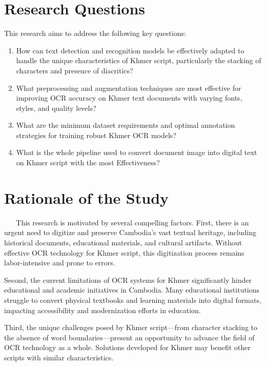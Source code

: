 \section{Research Questions}
\label{sec:questions}

This research aims to address the following key questions:

\begin{enumerate}
    \item How can text detection and recognition models be effectively adapted to handle the unique characteristics of Khmer script, particularly the stacking of characters and presence of diacritics?
    
    \item What preprocessing and augmentation techniques are most effective for improving OCR accuracy on Khmer text documents with varying fonts, styles, and quality levels?

    \item What are the minimum dataset requirements and optimal annotation strategies for training robust Khmer OCR models?
    
    \item What is the whole pipeline used to convert document image into digital text on Khmer script with the most Effectiveness?
\end{enumerate}

\section{Rationale of the Study}
\label{sec:rationale}
​​​​​  ​ ​ ​  ​ This research is motivated by several compelling factors. First, there is an urgent need to digitize and preserve Cambodia's vast textual heritage, including historical documents, educational materials, and cultural artifacts. Without effective OCR technology for Khmer script, this digitization process remains labor-intensive and prone to errors.

Second, the current limitations of OCR systems for Khmer significantly hinder educational and academic initiatives in Cambodia. Many educational institutions struggle to convert physical textbooks and learning materials into digital formats, impacting accessibility and modernization efforts in education.

Third, the unique challenges posed by Khmer script—from character stacking to the absence of word boundaries—present an opportunity to advance the field of OCR technology as a whole. Solutions developed for Khmer may benefit other scripts with similar characteristics.

